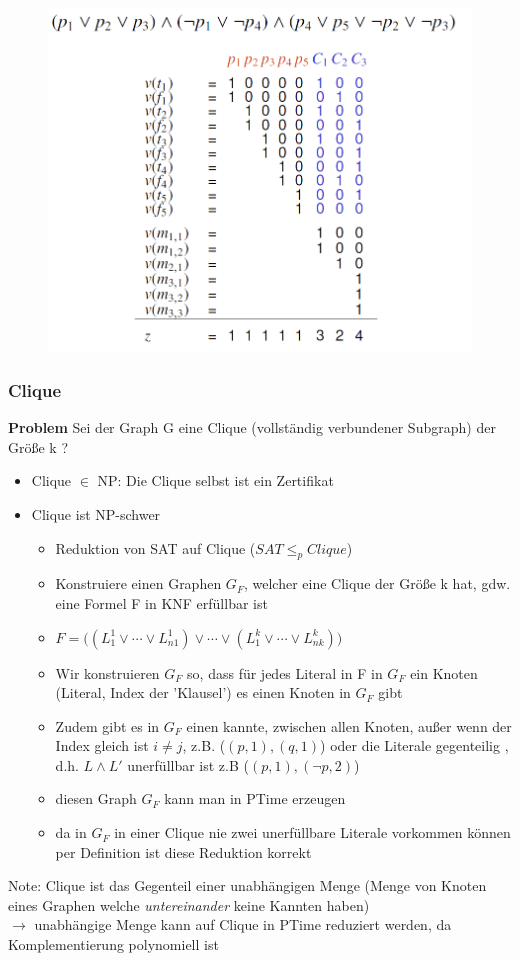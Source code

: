 \documentclass[12pt,a4paper]{article}
\begin{document}
\begin{figure}[H]
\includegraphics[scale=0.4]{./resources/TMS_beweis.png}
\end{figure}

\subsubsection{Clique}
\textbf{Problem}
Sei der Graph G eine Clique (vollständig verbundener Subgraph) der Größe k ?
\begin{itemize}
\item Clique $\in$ NP: Die Clique selbst ist ein Zertifikat
\item Clique ist NP-schwer
\begin{itemize}
\item Reduktion von SAT auf Clique ($SAT \leq_p Clique$)
\item Konstruiere einen Graphen $G_F$, welcher eine Clique der Größe k hat, gdw. eine Formel F in KNF erfüllbar ist
\item $F=\big((L_1^1 \lor \cdots \lor L_{n1}^1)\lor\cdots\lor (L_1^k\lor\cdots\lor L_{nk}^k)\big)$
\item Wir konstruieren $G_F$ so, dass für jedes Literal in F in $G_F$ ein Knoten (Literal, Index der 'Klausel') es einen Knoten in $G_F$ gibt
\item Zudem gibt es in $G_F$ einen kannte, zwischen allen Knoten, außer wenn der Index gleich ist $i\neq j$, z.B. ($(p, 1), (q, 1)$) oder die Literale gegenteilig , d.h. $L \land L'$ unerfüllbar ist z.B ($(p, 1), (\lnot p, 2)$)
\item diesen Graph $G_F$ kann man in PTime erzeugen
\item da in $G_F$ in einer Clique nie zwei unerfüllbare Literale vorkommen können per Definition ist diese Reduktion korrekt
\end{itemize}
\end{itemize}
Note: Clique ist das Gegenteil einer unabhängigen Menge (Menge von Knoten eines Graphen welche \textit{untereinander} keine Kannten haben)\\
$\rightarrow$ unabhängige Menge kann auf Clique in PTime reduziert werden, da Komplementierung polynomiell ist
\end{document}
